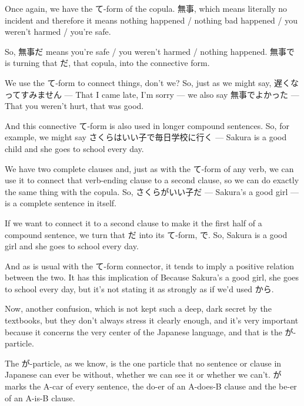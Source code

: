 {}

Once again, we have the て-form of the copula. 無事, which means literally no incident and therefore it means nothing happened / nothing bad happened / you weren't harmed / you're safe.

So, 無事だ means you're safe / you weren't harmed / nothing happened. 無事で is turning that だ, that copula, into the connective form.

We use the て-form to connect things, don't we? So, just as we might say, 遅くなってすみません --- That I came late, I'm sorry --- we also say 無事でよかった --- That you weren't hurt, that was good.

And this connective て-form is also used in longer compound sentences. So, for example, we might say さくらはいい子で毎日学校に行く --- Sakura is a good child and she goes to school every day.

We have two complete clauses and, just as with the て-form of any verb, we can use it to connect that verb-ending clause to a second clause, so we can do exactly the same thing with the copula. So, さくらがいい子だ --- Sakura's a good girl --- is a complete sentence in itself.

If we want to connect it to a second clause to make it the first half of a compound sentence, we turn that だ into its て-form, で. So, Sakura is a good girl and she goes to school every day.

And as is usual with the て-form connector, it tends to imply a positive relation between the two. It has this implication of Because Sakura's a good girl, she goes to school every day, but it's not stating it as strongly as if we'd used から.

\thinrule

Now, another confusion, which is not kept such a deep, dark secret by the textbooks, but they don't always stress it clearly enough, and it's very important because it concerns the very center of the Japanese language, and that is the が-particle.

\stopsectionlevel

\stopsectionlevel

\startsectionlevel[title={が clause connector},reference={が-clause-connector}]

The が-particle, as we know, is the one particle that no sentence or clause in Japanese can ever be without, whether we can see it or whether we can't. が marks the A-car of every sentence, the do-er of an A-does-B clause and the be-er of an A-is-B clause.

